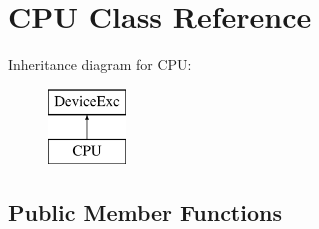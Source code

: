 \hypertarget{classCPU}{
\section{CPU Class Reference}
\label{classCPU}
}
Inheritance diagram for CPU:\begin{figure}[H]
\begin{center}
\leavevmode
\includegraphics[height=2cm]{classCPU}
\end{center}
\end{figure}
\subsection*{Public Member Functions}
